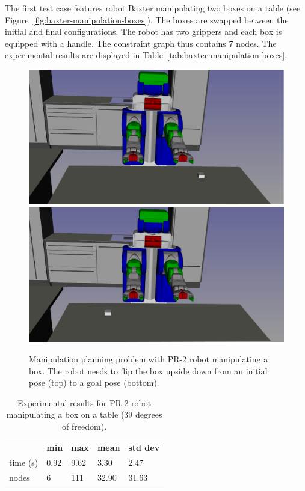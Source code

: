 The first test case features robot Baxter manipulating two boxes on a table (see Figure~\ref{fig:baxter-manipulation-boxes}). The boxes are swapped between the initial and final configurations. The robot has two grippers and each box is equipped with a handle. The constraint graph thus contains 7 nodes. The experimental results are displayed in Table~\ref{tab:baxter-manipulation-boxes}.

\begin{figure}
  \begin{center}
    \includegraphics[width=\linewidth]{figures/pr2-manipulation-two-hands-init.png}
    \includegraphics[width=\linewidth]{figures/pr2-manipulation-two-hands-goal.png}    
  \end{center}
  \caption{Manipulation planning problem with PR-2 robot manipulating a box. The robot needs to flip the box upside down from an initial pose (top) to a goal pose (bottom).}
  \label{fig:pr2-manipulation-two-hands}
\end{figure}

\begin{table}
  \begin{center}
  \begin{tabular}{|l|l|l|l|l|}
    \hline
    & min & max & mean & std dev \\
    \hline
    time (s) & 0.92 & 9.62 & 3.30 & 2.47 \\
    nodes & 6 &  111 & 32.90 & 31.63 \\
    \hline
  \end{tabular}
  \end{center}
  \caption{Experimental results for PR-2 robot manipulating a box on a table
     {\color{blue}(39 degrees of freedom)}.}
  \label{tab:pr2-manipulation-two-hands}
\end{table}

